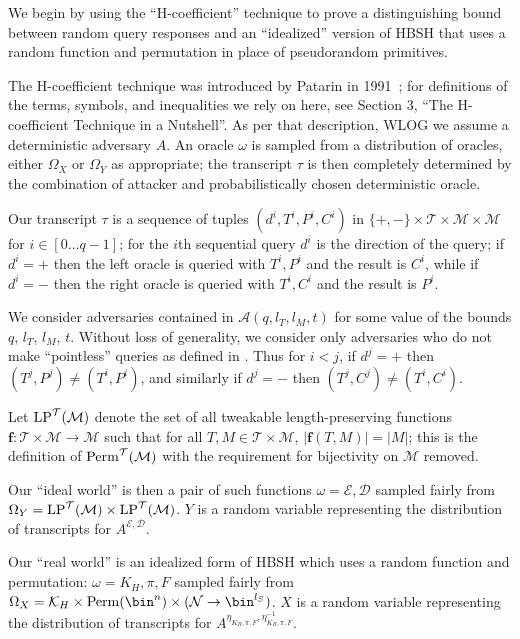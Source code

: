 \documentclass[eprint.tex]{subfiles}
\begin{document}
We begin by using the ``H-coefficient'' technique to prove a distinguishing bound
between random query responses and
an ``idealized'' version of HBSH that uses a random function and permutation
in place of pseudorandom primitives.

The H-coefficient technique was introduced by Patarin in 1991~\cite{ppdes,hco};
for definitions
of the terms, symbols, and inequalities we rely on here, see \cite{hco2} Section 3,
``The H-coefficient Technique in a Nutshell''.
As per that description, WLOG we assume a deterministic adversary $A$. An oracle $\omega$ is
sampled from a distribution of oracles, either $\Omega_X$ or
$\Omega_Y$ as appropriate; the transcript $\tau$ is then completely determined by the combination
of attacker and probabilistically chosen deterministic oracle.

Our transcript $\tau$ is a sequence of tuples
$(d^i, T^i, P^i, C^i)$
in
$\{+, -\} \times \mathcal{T} \times \mathcal{M} \times \mathcal{M}$
for $i \in [0 \ldots q-1]$;
for the $i$th sequential query
$d^i$ is the direction of the query;
if $d^i = +$ then the left oracle is queried with $T^i, P^i$ and the result is $C^i$,
while if $d^i = -$ then the right oracle is queried with $T^i, C^i$ and the result is $P^i$.

We consider adversaries contained in $\mathcal{A}(q, l_T, l_M, t)$ for some value of
the bounds $q$, $l_T$, $l_M$, $t$.
Without loss of generality, we consider only adversaries who do not make ``pointless''
queries as defined in \cite{cmc}. Thus for $i < j$, if $d^j = +$ then
$(T^j, P^j) \neq (T^i, P^i)$, and similarly if $d^j = -$ then
$(T^j, C^j) \neq (T^i, C^i)$.

Let $\operatorname{LP}^\mathcal{T}(\mathcal{M})$ denote the set of all
tweakable length-preserving functions
$\bm{f} : \mathcal{T} \times \mathcal{M} \rightarrow \mathcal{M}$
such that for all $T, M \in \mathcal{T} \times \mathcal{M}$,
$|\bm{f}(T, M)| = |M|$;
this is the definition of $\operatorname{Perm}^\mathcal{T}(\mathcal{M})$ with
the requirement for bijectivity on $\mathcal{M}$ removed.

Our ``ideal world''
is then a pair of such functions
$\omega = \mathcal{E}, \mathcal{D}$
sampled fairly from
$\Omega_Y = \operatorname{LP}^\mathcal{T}(\mathcal{M}) \times \operatorname{LP}^\mathcal{T}(\mathcal{M})$.
$Y$ is a random variable representing the distribution of transcripts for
$A^{\mathcal{E}, \mathcal{D}}$.

Our ``real world'' is an idealized form of HBSH which uses a random function and permutation:
$\omega = K_H, \pi, F$
sampled fairly from
$\Omega_X = \mathcal{K}_H \times \Perm(\bin^n) \times (\mathcal{N} \rightarrow \bin^{l_S})$.
$X$ is a random variable representing the distribution of transcripts for
$A^{\eta_{K_H, \pi, F}, \eta_{K_H, \pi, F}^{-1}}$.
\end{document}
